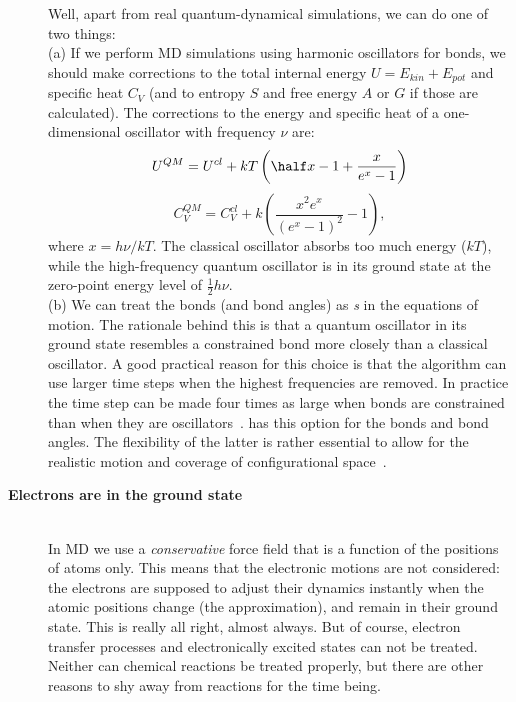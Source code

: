 \begin{description}
Well, apart from real quantum-dynamical simulations, we can do one
of two things: \\ (a) If we perform MD simulations using harmonic
oscillators for bonds, we should make corrections to the total
internal energy $U = E_{kin} + E_{pot}$ and specific heat $C_V$ (and
to entropy $S$ and free energy $A$ or $G$ if those are
calculated). The corrections to the energy and specific heat of a
one-dimensional oscillator with frequency $\nu$
are:~\cite{McQuarrie76}
\begin{equation}
 U^{QM} = U^{cl} +kT \left( \half x - 1 + \frac{x}{e^x-1} \right)
\end{equation}
\begin{equation}
 C_V^{QM} = C_V^{cl} + k \left( \frac{x^2e^x}{(e^x-1)^2} - 1 \right), 
\end{equation}
where $x=h\nu /kT$. The classical oscillator absorbs too much energy
($kT$), while the high-frequency quantum oscillator is in its ground
state at the zero-point energy level of $\frac{1}{2} h\nu$. \\ (b) We
can treat the bonds (and bond angles) as {\em {}s}
in the equations of motion. The rationale behind this is that a quantum
oscillator in its ground state resembles a constrained bond more
closely than a classical oscillator. A good practical reason for this
choice is that the algorithm can use larger time steps when the
highest frequencies are removed. In practice the time step can be made
four times as large when bonds are constrained than when they are
oscillators~\cite{Gunsteren77}. {\gromacs} has this option for the
bonds and bond angles.  The flexibility of the latter is
rather essential to allow for the realistic motion and coverage of
configurational space~\cite{Gunsteren82}.

\item[{\bf Electrons are in the ground state}]\mbox{}\\
In MD we use a {\em conservative} force field that is a
function of the positions of atoms only.  This means that the
electronic motions are not considered: the electrons are supposed to
adjust their dynamics instantly when the atomic positions change
(the {\em {}} approximation), and remain in
their ground state. This is really all right, almost always. But of
course, electron transfer processes and electronically excited states
can not be treated. Neither can chemical reactions be treated
properly, but there are other reasons to shy away from reactions for
the time being.


\end{description}
